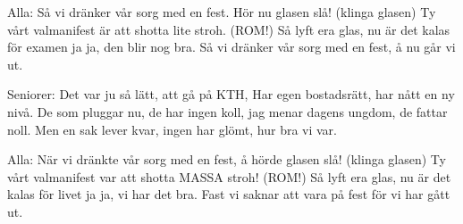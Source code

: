 {Alla:
Så vi dränker vår sorg med en fest.
Hör nu glasen slå! (klinga glasen)
Ty vårt valmanifest
är att shotta lite stroh. (ROM!)
Så lyft era glas, nu är det kalas
för examen ja ja, den blir nog bra.
Så vi dränker vår sorg med en fest,
å nu går vi ut.

Seniorer:
Det var ju så lätt, att gå på KTH,
Har egen bostadsrätt, har nått en ny nivå.
De som pluggar nu, de har ingen koll,
jag menar dagens ungdom, de fattar noll.
Men en sak lever kvar, ingen har glömt, hur bra vi var.

Alla:
När vi dränkte vår sorg med en fest,
å hörde glasen slå! (klinga glasen)
Ty vårt valmanifest
var att shotta MASSA stroh! (ROM!)
Så lyft era glas, nu är det kalas
för livet ja ja, vi har det bra.
Fast vi saknar att vara på fest
för vi har gått ut.}





